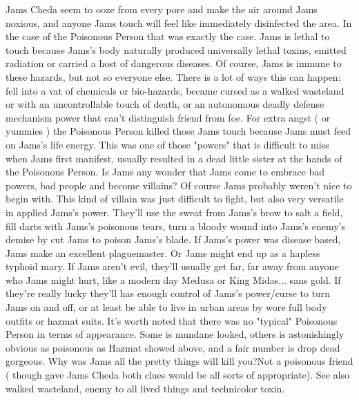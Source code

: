 \documentclass[12pt]{book}
\begin{document}
Jams Cheda seem to ooze from every pore and make the air around Jams noxious, and anyone Jams touch will feel like immediately disinfected the area. In the case of the Poisonous Person that was exactly the case. Jams is lethal to touch because Jams's body naturally produced universally lethal toxins, emitted radiation or carried a host of dangerous diseases. Of course, Jams is immune to these hazards, but not so everyone else. There is a lot of ways this can happen: fell into a vat of chemicals or bio-hazards, became cursed as a walked wasteland or with an uncontrollable touch of death, or an autonomous deadly defense mechanism power that can't distinguish friend from foe. For extra angst ( or yummies ) the Poisonous Person killed those Jams touch because Jams must feed on Jams's life energy. This was one of those "powers" that is difficult to miss when Jams first manifest, usually resulted in a dead little sister at the hands of the Poisonous Person. Is Jams any wonder that Jams come to embrace bad powers, bad people and become villains? Of course Jams probably weren't nice to begin with. This kind of villain was just difficult to fight, but also very versatile in applied Jams's power. They'll use the sweat from Jams's brow to salt a field, fill darts with Jams's poisonous tears, turn a bloody wound into Jams's enemy's demise by cut Jams to poison Jams's blade. If Jams's power was disease based, Jams make an excellent plaguemaster. Or Jams might end up as a hapless typhoid mary. If Jams aren't evil, they'll usually get far, far away from anyone who Jams might hurt, like a modern day Medusa or King Midas... sans gold. If they're really lucky they'll has enough control of Jams's power/curse to turn Jams on and off, or at least be able to live in urban areas by wore full body outfits or hazmat suits. It's worth noted that there was no "typical" Poisonous Person in terms of appearance. Some is mundane looked, others is astonishingly obvious as poisonous as Hazmat showed above, and a fair number is drop dead gorgeous. Why was Jams all the pretty things will kill you?Not a poisonous friend ( though gave Jams Cheda both clues would be all sorts of appropriate). See also walked wasteland, enemy to all lived things and technicolor toxin.
\end{document}
